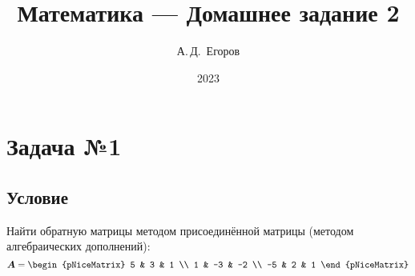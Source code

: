 \documentclass[12pt, a4paper]{article}
\title{Математика --- Домашнее задание 2}
\author{А.\,Д.~Егоров}
\date{2023}
\renewcommand{\vec}[1]{\text{\mathversion{bold}${#1}$}}%
\begin{document}
	
	\maketitle
	\tableofcontents
	\pagebreak
	
	\section{Задача №1}
	
		\subsection*{Условие}		
			Найти обратную матрицы методом присоединённой матрицы (методом алгебраических дополнений):
			\begin{equation}
				\label{mat_1}
				\vec A = 
				\begin{pNiceMatrix}
					5 & 3 & 1 \\
					1 & -3 & -2 \\
					-5 & 2 & 1					
				\end{pNiceMatrix}
			\end{equation}
			
			
\end{document}

